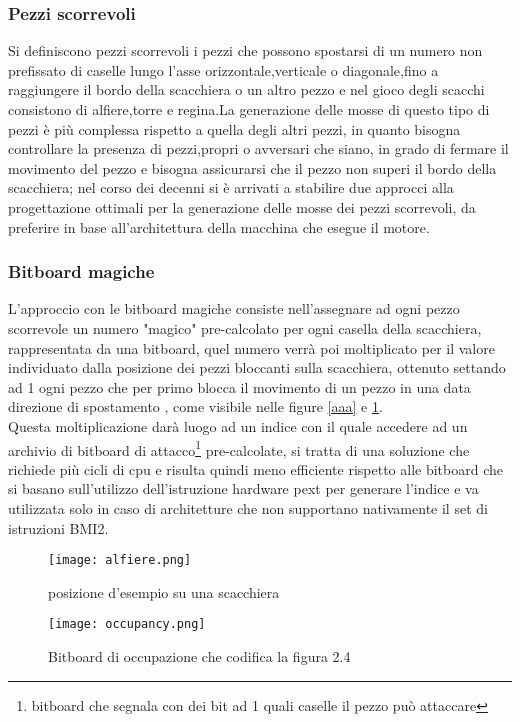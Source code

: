 \subsubsection{Pezzi  scorrevoli}
Si definiscono pezzi scorrevoli i pezzi che possono spostarsi di un numero non prefissato di caselle lungo l'asse orizzontale,verticale o diagonale,fino a raggiungere il bordo della scacchiera o un altro pezzo
e nel gioco degli scacchi consistono di alfiere,torre e regina.La generazione delle mosse di questo tipo di pezzi è più complessa rispetto a quella degli altri pezzi, in quanto bisogna controllare la presenza di pezzi,propri
o avversari che siano, in grado di fermare il movimento del pezzo e bisogna assicurarsi che il pezzo non superi il bordo della scacchiera;
nel corso  dei decenni si è arrivati a stabilire due approcci alla progettazione ottimali per la generazione delle mosse dei pezzi scorrevoli, 
da preferire in base all'architettura della macchina che esegue il motore.

\subsubsection{Bitboard magiche}
L'approccio con le bitboard magiche consiste nell'assegnare ad ogni pezzo scorrevole un numero "magico" pre-calcolato per ogni casella della scacchiera, rappresentata da una bitboard, quel numero verrà poi moltiplicato
 per il valore individuato dalla posizione dei pezzi bloccanti sulla scacchiera, ottenuto settando ad 1 ogni pezzo che per primo blocca il movimento di un pezzo in una data direzione di spostamento , come 
 visibile nelle  figure \ref{aaa} e \ref{bbb}.\\  
Questa moltiplicazione darà luogo ad un indice con il quale accedere ad un archivio di bitboard di 
attacco\footnote{bitboard che segnala con dei bit ad 1 quali caselle il pezzo può attaccare} pre-calcolate, si tratta di una soluzione che richiede più cicli di cpu e risulta quindi meno efficiente rispetto alle bitboard che si basano sull'utilizzo dell'istruzione hardware pext per generare l'indice
e va utilizzata solo in caso di architetture che non supportano nativamente il set di istruzioni BMI2.


\begin{figure}
    \centering
    \begin{minipage}{0.45\textwidth}
        \centering
        \texttt{[image: alfiere.png]} %
        \caption{posizione d'esempio su una scacchiera}
        \label{aaa}
    \end{minipage}\hfill
    \begin{minipage}{0.45\textwidth}
        \centering
        \texttt{[image: occupancy.png]} %
        \caption{Bitboard di occupazione che codifica la figura 2.4}
        \label{bbb}
    \end{minipage}
\end{figure}




